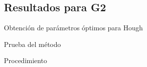 \documentclass[spanish]{beamer}
\begin{document}
\subsection{Resultados para G2}
%
%
\begin{frame}{Obtención de parámetros óptimos para Hough}
\end{frame}
%
\begin{frame}{Prueba del método}
\end{frame}
%
\begin{frame}{Procedimiento}
\end{frame}
%
\end{document}
